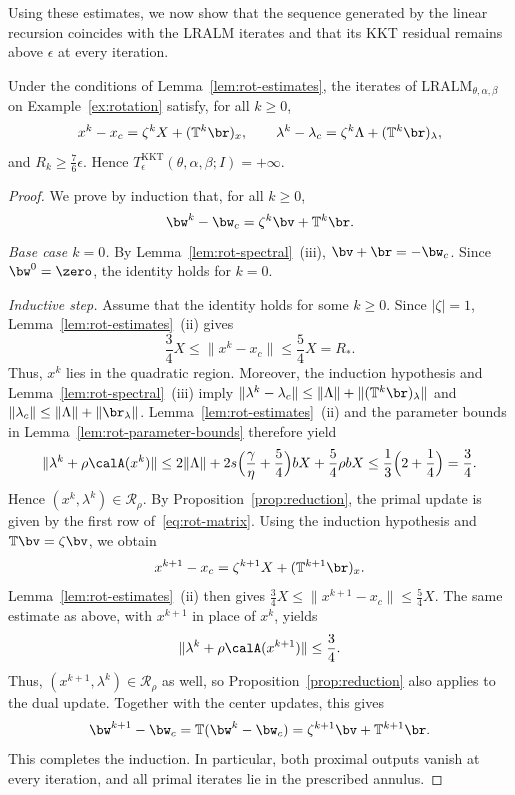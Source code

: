 Using these estimates, we now show that the sequence generated by the linear
recursion coincides with the LRALM iterates and that its KKT residual
remains above \(\epsilon\) at every iteration.

\begin{lemma}
\label{lem:rot-trajectory}
Under the conditions of Lemma~\ref{lem:rot-estimates}, the iterates of
\(\mathrm{LRALM}_{\theta,\alpha,\beta}\) on Example~\ref{ex:rotation}
satisfy, for all \(k\ge0\),
\[
x^k-x_c=\zeta^kX+(\mathbb T^k\br)_x,
\qquad
\lambda^k-\lambda_c=\zeta^k\Lambda+(\mathbb T^k\br)_\lambda,
\]
and \(R_k\ge\frac76\epsilon\). Hence
\(T^{\mathrm{KKT}}_\epsilon(\theta,\alpha,\beta;I)=+\infty\).
\end{lemma}

\begin{proof}
We prove by induction that, for all \(k\ge0\),
\[
\bw^k-\bw_c=\zeta^k\bv+\mathbb T^k\br.
\]
\emph{Base case \(k=0\).} By Lemma~\ref{lem:rot-spectral}~(iii),
\(\bv+\br=-\bw_c\). Since \(\bw^0=\zero\), the identity holds for \(k=0\).

\emph{Inductive step.} Assume that the identity holds for some \(k\ge0\).
Since \(|\zeta|=1\), Lemma~\ref{lem:rot-estimates}~(ii) gives
\[
\frac34X\le\|x^k-x_c\|\le\frac54X=R_*.
\]
Thus, \(x^k\) lies in the quadratic region. Moreover, the induction
hypothesis and Lemma~\ref{lem:rot-spectral}~(iii) imply
\(\|\lambda^k-\lambda_c\|\le\|\Lambda\|+\|(\mathbb T^k\br)_\lambda\|\)
and \(\|\lambda_c\|\le\|\Lambda\|+\|\br_\lambda\|\).
Lemma~\ref{lem:rot-estimates}~(ii) and the parameter bounds in
Lemma~\ref{lem:rot-parameter-bounds} therefore yield
\[
\|\lambda^k+\rho\calA(x^k)\|
\le2\|\Lambda\|+2s\Bigl(\frac{\gamma}{\eta}+\frac54\Bigr)bX+\frac54\rho bX
\le\frac13\Bigl(2+\frac14\Bigr)=\frac34.
\]
Hence \((x^k,\lambda^k)\in\mathcal R_\rho\). By
Proposition~\ref{prop:reduction}, the primal update is given by the first
row of~\eqref{eq:rot-matrix}. Using the induction hypothesis and
\(\mathbb T\bv=\zeta\bv\), we obtain
\[
x^{k+1}-x_c=\zeta^{k+1}X+(\mathbb T^{k+1}\br)_x.
\]
Lemma~\ref{lem:rot-estimates}~(ii) then gives
\(\frac34X\le\|x^{k+1}-x_c\|\le\frac54X\).
The same estimate as above, with \(x^{k+1}\) in place of \(x^k\), yields
\[
\|\lambda^k+\rho\calA(x^{k+1})\|\le\frac34.
\]
Thus, \((x^{k+1},\lambda^k)\in\mathcal R_\rho\) as well, so
Proposition~\ref{prop:reduction} also applies to the dual update.
Together with the center updates, this gives
\[
\bw^{k+1}-\bw_c
=\mathbb T(\bw^k-\bw_c)
=\zeta^{k+1}\bv+\mathbb T^{k+1}\br.
\]
This completes the induction. In particular, both proximal outputs vanish
at every iteration, and all primal iterates lie in the prescribed annulus.


\end{proof}
